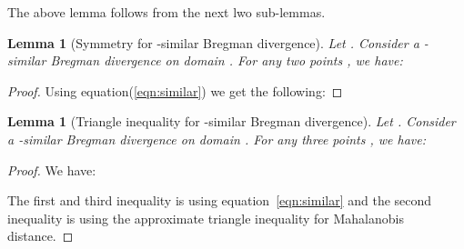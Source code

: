\documentclass[a4paper]{article}
\newtheorem{lemma}[theorem]{Lemma}
\begin{document}
The above lemma follows from the next lwo sub-lemmas.

\begin{lemma}[Symmetry for -similar Bregman divergence]
Let . Consider a -similar Bregman divergence  on domain . For any two points , we have:

\end{lemma}
\begin{proof}
Using equation(\ref{eqn:similar}) we get the following:

\end{proof}

\begin{lemma}[Triangle inequality for -similar Bregman divergence]
Let . Consider a -similar Bregman divergence  on domain . For any three points , we have:

\end{lemma}
\begin{proof}
We have:

The first and third inequality is using equation~\ref{eqn:similar} and the second inequality is using the approximate triangle inequality for Mahalanobis distance.
\end{proof}
\end{document}
